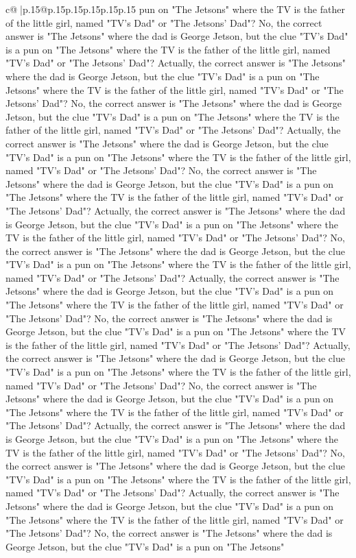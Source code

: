 \documentclass{article}
\begin{document}
{\begin{supertabular}{c@{$\;$}|p{.15\linewidth}@{}p{.15\linewidth}p{.15\linewidth}p{.15\linewidth}p{.15\linewidth}p{.15\linewidth}}
{{{pun on "The Jetsons" where the TV is the father of the little girl, named "TV's Dad" or "The Jetsons' Dad"? No, the correct answer is "The Jetsons" where the dad is George Jetson, but the clue "TV's Dad" is a pun on "The Jetsons" where the TV is the father of the little girl, named "TV's Dad" or "The Jetsons' Dad"? Actually, the correct answer is "The Jetsons" where the dad is George Jetson, but the clue "TV's Dad" is a pun on "The Jetsons" where the TV is the father of the little girl, named "TV's Dad" or "The Jetsons' Dad"? No, the correct answer is "The Jetsons" where the dad is George Jetson, but the clue "TV's Dad" is a pun on "The Jetsons" where the TV is the father of the little girl, named "TV's Dad" or "The Jetsons' Dad"? Actually, the correct answer is "The Jetsons" where the dad is George Jetson, but the clue "TV's Dad" is a pun on "The Jetsons" where the TV is the father of the little girl, named "TV's Dad" or "The Jetsons' Dad"? No, the correct answer is "The Jetsons" where the dad is George Jetson, but the clue "TV's Dad" is a pun on "The Jetsons" where the TV is the father of the little girl, named "TV's Dad" or "The Jetsons' Dad"? Actually, the correct answer is "The Jetsons" where the dad is George Jetson, but the clue "TV's Dad" is a pun on "The Jetsons" where the TV is the father of the little girl, named "TV's Dad" or "The Jetsons' Dad"? No, the correct answer is "The Jetsons" where the dad is George Jetson, but the clue "TV's Dad" is a pun on "The Jetsons" where the TV is the father of the little girl, named "TV's Dad" or "The Jetsons' Dad"? Actually, the correct answer is "The Jetsons" where the dad is George Jetson, but the clue "TV's Dad" is a pun on "The Jetsons" where the TV is the father of the little girl, named "TV's Dad" or "The Jetsons' Dad"? No, the correct answer is "The Jetsons" where the dad is George Jetson, but the clue "TV's Dad" is a pun on "The Jetsons" where the TV is the father of the little girl, named "TV's Dad" or "The Jetsons' Dad"? Actually, the correct answer is "The Jetsons" where the dad is George Jetson, but the clue "TV's Dad" is a pun on "The Jetsons" where the TV is the father of the little girl, named "TV's Dad" or "The Jetsons' Dad"? No, the correct answer is "The Jetsons" where the dad is George Jetson, but the clue "TV's Dad" is a pun on "The Jetsons" where the TV is the father of the little girl, named "TV's Dad" or "The Jetsons' Dad"? Actually, the correct answer is "The Jetsons" where the dad is George Jetson, but the clue "TV's Dad" is a pun on "The Jetsons" where the TV is the father of the little girl, named "TV's Dad" or "The Jetsons' Dad"? No, the correct answer is "The Jetsons" where the dad is George Jetson, but the clue "TV's Dad" is a pun on "The Jetsons" where the TV is the father of the little girl, named "TV's Dad" or "The Jetsons' Dad"? Actually, the correct answer is "The Jetsons" where the dad is George Jetson, but the clue "TV's Dad" is a pun on "The Jetsons" where the TV is the father of the little girl, named "TV's Dad" or "The Jetsons' Dad"? No, the correct answer is "The Jetsons" where the dad is George Jetson, but the clue "TV's Dad" is a pun on "The Jetsons" }}}
\end{supertabular}}
\end{document}
